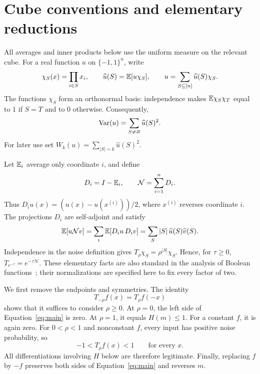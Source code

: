 \section{Cube conventions and elementary reductions}\label{sec:preliminaries}
All averages and inner products below use the uniform measure on the relevant cube. For a real function \(u\) on \(\{-1,1\}^n\), write
\[
\chi_S(x)=\prod_{i\in S}x_i,\qquad
\widehat u(S)=\mathbb E[u\chi_S],\qquad
u=\sum_{S\subseteq[n]}\widehat u(S)\chi_S.
\]
The functions \(\chi_S\) form an orthonormal basis: independence makes
\(\mathbb E\chi_S\chi_T\) equal to \(1\) if \(S=T\) and to \(0\) otherwise.
Consequently,
\[
\operatorname{Var}(u)=\sum_{S\ne\varnothing}\widehat u(S)^2.
\]
For later use set \(W_k(u)=\sum_{|S|=k}\widehat u(S)^2\).

Let \(\mathbb E_i\) average only coordinate \(i\), and define
\[
D_i=I-\mathbb E_i,\qquad \mathcal N=\sum_{i=1}^n D_i.
\]
Thus \(D_i u(x)=(u(x)-u(x^{(i)}))/2\), where \(x^{(i)}\) reverses coordinate \(i\).
The projections \(D_i\) are self-adjoint and satisfy
\begin{equation}\label{eq:dirichlet}
\mathbb E[u\mathcal N v]
=\sum_i\mathbb E[D_i u\,D_i v]
=\sum_S |S|\,\widehat u(S)\widehat v(S).
\end{equation}
Independence in the noise definition gives
\(T_\rho\chi_S=\rho^{|S|}\chi_S\). Hence, for \(\tau\ge0\),
\(T_{e^{-\tau}}=e^{-\tau\mathcal N}\).
These elementary facts are also standard in the analysis of Boolean functions~\cite{ODonnell14}; their normalizations are specified here to fix every factor of two.

We first remove the endpoints and symmetries.
The identity
\[
T_{-\rho}f(x)=T_\rho f(-x)
\]
shows that it suffices to consider \(\rho\ge0\). At \(\rho=0\), the left side of Equation~\eqref{eq:main} is zero. At \(\rho=1\), it equals \(H(m)\le1\). For a constant \(f\), it is again zero.
For \(0<\rho<1\) and nonconstant \(f\), every input has positive noise probability, so
\[
-1<T_\rho f(x)<1\qquad\text{for every }x.
\]
All differentiations involving \(H\) below are therefore legitimate. Finally,
replacing \(f\) by \(-f\) preserves both sides of Equation~\eqref{eq:main} and reverses \(m\).

